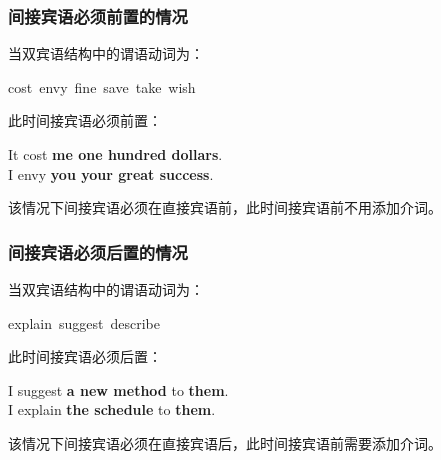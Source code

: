 \documentclass[UTF8]{ctexart}
\begin{document}
\newpage

\subsubsection{间接宾语必须前置的情况}
    当双宾语结构中的谓语动词为：
    \begin{center}
        \ttfamily
        cost~envy~fine~save~take~wish
    \end{center}
    此时间接宾语必须前置：
    \begin{center}
        \large
        \ttfamily
        It cost \textbf{me one hundred dollars}.\\[3mm]
        I envy \textbf{you your great success}.\\[3mm]
    \end{center}
    该情况下间接宾语必须在直接宾语前，此时间接宾语前不用添加介词。\vspace{10pt}

\subsubsection{间接宾语必须后置的情况}
    当双宾语结构中的谓语动词为：
    \begin{center}
        \ttfamily
        explain~suggest~describe
    \end{center}
    此时间接宾语必须后置：
    \begin{center}
        \large
        \ttfamily
        I suggest \textbf{a new method} to \textbf{them}.\\[3mm]
        I explain \textbf{the schedule} to \textbf{them}.\\[3mm]
    \end{center}
    该情况下间接宾语必须在直接宾语后，此时间接宾语前需要添加介词。\vspace{10pt}
\end{document}
